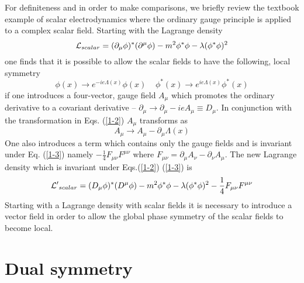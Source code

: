 \documentclass[a4paper,aps]{revtex4}
\begin{document}
For definiteness and in order to make comparisons, we briefly
review the textbook example \cite{ryder} of scalar electrodynamics
where the ordinary gauge principle is applied to a complex scalar
field. Starting with the Lagrange density
\begin{equation}
\label{1-1}
{\cal L}_{scalar} = (\partial _{\mu} \phi) ^{\ast} (\partial ^{\mu} \phi)
-m^2 \phi ^{\ast} \phi - \lambda (\phi ^{\ast} \phi)^2
\end{equation}
one finds that it is possible to allow the scalar fields to have
the following, local symmetry
\begin{equation}
\label{1-2}
\phi (x) \rightarrow e^{-ie \Lambda (x)} \phi (x)
\; \; \; \;
\phi ^{\ast} (x) \rightarrow e^{ie \Lambda (x)} \phi ^{\ast} (x)
\end{equation}
if one introduces a four-vector, gauge field $A_{\mu}$ which
promotes the ordinary derivative to a covariant derivative --
$\partial _{\mu} \rightarrow \partial _{\mu} -i e A_{\mu} \equiv D_{\mu}$.
In conjunction with the transformation in Eqs. (\ref{1-2})
$A_{\mu}$ transforms as
\begin{equation}
\label{1-3}
A_{\mu} \rightarrow A_{\mu} -\partial _{\mu} \Lambda (x)
\end{equation}
One also introduces a term which contains only the gauge
fields and is invariant under Eq. (\ref{1-3}) namely
$-\frac{1}{4} F_{\mu \nu} F^{\mu \nu}$ where
$F_{\mu \nu} =\partial _{\mu} A_{\nu} - \partial _{\nu} A_{\mu}$.
The new Lagrange density which is invariant under
Eqs.(\ref{1-2}) (\ref{1-3}) is
\begin{equation}
\label{1-4}
{\cal L'}_{scalar} = (D_{\mu} \phi) ^{\ast} (D ^{\mu} \phi)
-m^2 \phi ^{\ast} \phi - \lambda (\phi ^{\ast} \phi)^2
-\frac{1}{4} F_{\mu \nu} F^{\mu \nu}
\end{equation}
Starting with a Lagrange density with scalar
fields it is necessary to introduce a vector field
in order to allow the global phase symmetry of the scalar
fields to become local. 

\section{Dual symmetry}
\end{document}
